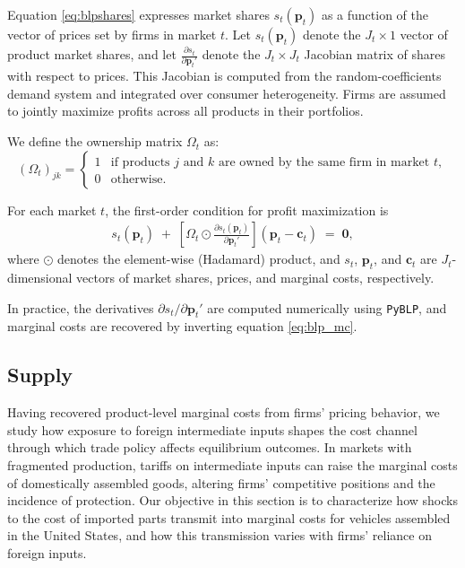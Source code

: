 \documentclass[11pt]{article}
\begin{document}
Equation \eqref{eq:blpshares} expresses market shares \(s_t(\mathbf{p}_t)\) as a function of the vector of prices set by firms in market \(t\). Let \(s_t(\mathbf{p}_t)\) denote the \(J_t \times 1\) vector of product market shares, and let \(\frac{\partial s_t}{\partial \mathbf{p}_t'}\) denote the \(J_t \times J_t\) Jacobian matrix of shares with respect to prices. This Jacobian is computed from the random-coefficients demand system and integrated over consumer heterogeneity. Firms are assumed to jointly maximize profits across all products in their portfolios.

We define the ownership matrix \(\Omega_t\) as:
\[
(\Omega_t)_{jk} =
\begin{cases}
1 & \text{if products } j \text{ and } k \text{ are owned by the same firm in market } t, \\
0 & \text{otherwise.}
\end{cases}
\]

For each market \(t\), the first-order condition for profit maximization is
\begin{align}\label{eq:blp_mc}
    s_t(\mathbf{p}_t)
    \;+\;
    \left[\Omega_t \odot \frac{\partial s_t(\mathbf{p}_t)}{\partial \mathbf{p}_t'}\right]
    (\mathbf{p}_t - \mathbf{c}_t)
    \;=\; \mathbf{0},
\end{align}
where \(\odot\) denotes the element-wise (Hadamard) product, and \(s_t\), \(\mathbf{p}_t\), and \(\mathbf{c}_t\) are \(J_t\)-dimensional vectors of market shares, prices, and marginal costs, respectively.

In practice, the derivatives \(\partial s_t / \partial \mathbf{p}_t'\) are computed numerically using \texttt{PyBLP}, and marginal costs are recovered by inverting equation \eqref{eq:blp_mc}.

\subsection{Supply}
Having recovered product-level marginal costs from firms’ pricing behavior, we study how exposure to foreign intermediate inputs shapes the cost channel through which trade policy affects equilibrium outcomes. In markets with fragmented production, tariffs on intermediate inputs can raise the marginal costs of domestically assembled goods, altering firms’ competitive positions and the incidence of protection. Our objective in this section is to characterize how shocks to the cost of imported parts transmit into marginal costs for vehicles assembled in the United States, and how this transmission varies with firms’ reliance on foreign inputs.
\end{document}
